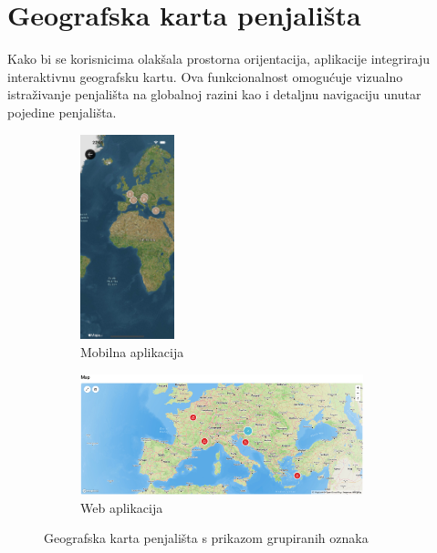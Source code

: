 \section{Geografska karta penjališta}

Kako bi se korisnicima olakšala prostorna orijentacija, aplikacije integriraju interaktivnu geografsku kartu. Ova funkcionalnost omogućuje vizualno istraživanje penjališta na globalnoj razini kao i detaljnu navigaciju unutar pojedine penjališta.

\begin{figure}[H]
    \centering
    \begin{subfigure}[b]{\textwidth}
        \centering
        \includegraphics[width=0.3\textwidth]{images/implementacija/geo_karta.png}
        \caption{Mobilna aplikacija}
        \label{fig:geografska_karta_mob}
    \end{subfigure}
    \hfill
    \begin{subfigure}[b]{\textwidth}
        \centering
        \includegraphics[width=0.9\textwidth]{images/implementacija/web/map_clusters.jpeg}
        \caption{Web aplikacija}
        \label{fig:geografska_karta_web}
    \end{subfigure}
    \caption{Geografska karta penjališta s prikazom grupiranih oznaka}
    \label{fig:geografska_karta_sidebyside}
\end{figure}

